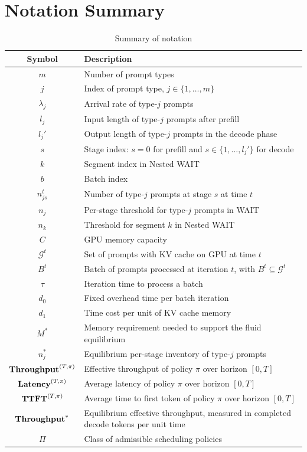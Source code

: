 \section{Notation Summary}
\label{app:notation}

\begin{table}[htbp]
\centering
\caption{Summary of notation}
\label{tab:notation}
\small
\begin{tabular}{cl}
\toprule
\textbf{Symbol} & \textbf{Description} \\
\midrule
$m$ & Number of prompt types \\
$j$ & Index of prompt type, $j \in \{1, \dots, m\}$ \\
$\lambda_j$ & Arrival rate of type-$j$ prompts \\
$l_j$ & Input length of type-$j$ prompts after prefill \\
$l_j'$ & Output length of type-$j$ prompts in the decode phase \\
$s$ & Stage index: $s=0$ for prefill and $s \in \{1, \dots, l_j'\}$ for decode \\
$k$ & Segment index in Nested WAIT \\
$b$ & Batch index \\
$n_{js}^t$ & Number of type-$j$ prompts at stage $s$ at time $t$ \\
$n_j$ & Per-stage threshold for type-$j$ prompts in WAIT \\
$n_k$ & Threshold for segment $k$ in Nested WAIT \\
\midrule
$C$ & GPU memory capacity \\
$\mathcal{G}^t$ & Set of prompts with KV cache on GPU at time $t$ \\
$B^t$ & Batch of prompts processed at iteration $t$, with $B^t \subseteq \mathcal{G}^t$ \\
$\tau$ & Iteration time to process a batch \\
$d_0$ & Fixed overhead time per batch iteration \\
$d_1$ & Time cost per unit of KV cache memory \\
\midrule
$M^*$ & Memory requirement needed to support the fluid equilibrium \\
$n_j^*$ & Equilibrium per-stage inventory of type-$j$ prompts \\
$\textbf{Throughput}^{(T,\pi)}$ & Effective throughput of policy $\pi$ over horizon $[0,T]$ \\
$\textbf{Latency}^{(T,\pi)}$ & Average latency of policy $\pi$ over horizon $[0,T]$ \\
$\textbf{TTFT}^{(T,\pi)}$ & Average time to first token of policy $\pi$ over horizon $[0,T]$ \\
$\textbf{Throughput}^*$ & Equilibrium effective throughput, measured in completed decode tokens per unit time \\
$\Pi$ & Class of admissible scheduling policies \\
\bottomrule
\end{tabular}
\end{table}
